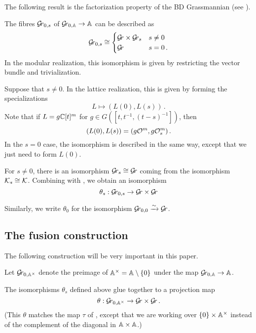 \documentclass{article}
\begin{document}
The following result is the factorization property of the BD Grassmannian (see \cite[Prop. 3.13]{zhu2016introduction}).
\begin{proposition}
    \label{pr:polyno-taylor}
    The fibres $ \Gr_{0,s}$ of $ \Grbd \rightarrow \AA$ can be described as 
    \begin{equation*}
    \Gr_{0,s} \cong 
        \begin{cases} 
            \Gr \times \Gr_s & s \ne 0 \\
            \Gr              & s = 0\,.
        \end{cases}
    \end{equation*}
    In the modular realization, this isomorphism is given by restricting the vector bundle and trivialization.
    
    Suppose that $ s \ne 0 $. In the lattice realization, this is given by forming the specializations 
    $$
        L \mapsto (L(0), L(s))\,.
    $$
    Note that if $ L = g \CC[t]^m$ for $ g \in G([t,t^{-1}, (t-s)^{-1}])$, then 
    $$
        (L(0), L(s)) = (g \cO^m, g\cO^m_s)\,. 
    $$
    In the $ s = 0 $ case, the isomorphism is described in the same way, except that we just need to form $ L(0)$.
\end{proposition}

For $ s \ne 0$, there is an isomorphism $ \Gr_s \cong \Gr $ coming from the isomorphism $ \Ks \cong \cK$. 
% 
Combining with , we obtain an isomorphism
$$
    \theta_s : \Gr_{0,s} \rightarrow \Gr \times \Gr 
$$

Similarly, we write $ \theta_0$ for the isomorphism $ \Gr_{0,0} \xrightarrow{\sim} \Gr $.
% 

\subsection{The fusion construction}
\label{ss:fuscon}

The following construction will be very important in this paper.  

Let $ \Gr_{0, \AA^\times} $ denote the preimage of $\Ax = \AA \setminus \{0\}$ under the map $\Gr_{0,\AA} \rightarrow \AA $.  

The isomorphisms $ \theta_s $ defined above glue together to a projection map
\begin{equation}
\label{eq:mvitau}
    \theta : \Gr_{0, \AA^\times} \rightarrow \Gr \times \Gr \, .
\end{equation}
(This $\theta$ matches the map $ \tau $ of \cite{mirkovic2007geometric}, except that we are working over $ \{0 \} \times \AA^\times$ instead of the complement of the diagonal in $ \AA\times\AA $.)
\end{document}
